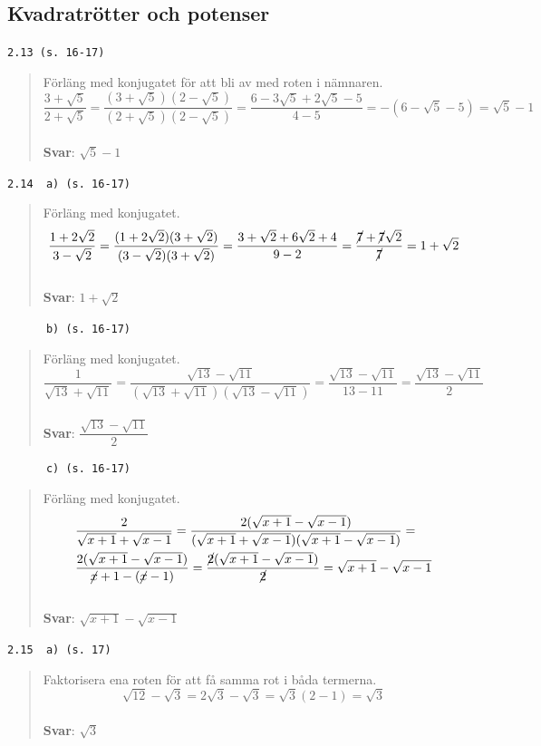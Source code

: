 \documentclass[a4paper]{article}
\newcommand{\tskcol}[1]{\textcolor{tskcol}{#1}}
\begin{document}
	\subsection*{Kvadratrötter och potenser}
	
	\texttt{\tskcol{2.13 (s. 16-17)}}
	\begin{quotation}
		\noindent
		Förläng med konjugatet för att bli av med roten i nämnaren.
		\[\dfrac{3+\sqrt{5}}{2+\sqrt{5}}=
		\dfrac{(3+\sqrt{5})(2-\sqrt{5})}{(2+\sqrt{5})(2-\sqrt{5})}=
		\dfrac{6-3\sqrt{5}+2\sqrt{5}-5}{4-5}=
		-(6-\sqrt{5}-5)=
		\sqrt{5}-1\]
		\\
		\textbf{Svar}: $\sqrt{5}-1$
	\end{quotation}
	
	\texttt{\tskcol{2.14~~a) (s. 16-17)}}
	\begin{quotation}
		\noindent
		Förläng med konjugatet.
		\[\dfrac{1+2\sqrt{2}}{3-\sqrt{2}}=
		\dfrac{(1+2\sqrt{2})(3+\sqrt{2})}{(3-\sqrt{2})(3+\sqrt{2})}=
		\dfrac{3+\sqrt{2}+6\sqrt{2}+4}{9-2}=
		\dfrac{\cancel{7}+\cancel{7}\sqrt{2}}{\cancel{7}}=
		1+\sqrt{2}\]
		\\
		\textbf{Svar}: $1+\sqrt{2}$
		
	\end{quotation}
	
	\pagebreak
	\texttt{\tskcol{~~~~~~b) (s. 16-17)}}
	\begin{quotation}
		\noindent
		Förläng med konjugatet.
		\[\dfrac{1}{\sqrt{13}+\sqrt{11}}=
		\dfrac{\sqrt{13}-\sqrt{11}}{(\sqrt{13}+\sqrt{11})(\sqrt{13}-\sqrt{11})}=
		\dfrac{\sqrt{13}-\sqrt{11}}{13-11}=
		\dfrac{\sqrt{13}-\sqrt{11}}{2}\]
		\\
		\textbf{Svar}: $\dfrac{\sqrt{13}-\sqrt{11}}{2}$
	\end{quotation}
	
	\texttt{\tskcol{~~~~~~c) (s. 16-17)}}
	\begin{quotation}
		\noindent
		Förläng med konjugatet.
		\begin{align*}
		&\dfrac{2}{\sqrt{x+1}+\sqrt{x-1}}=
		\dfrac{2(\sqrt{x+1}-\sqrt{x-1})}{(\sqrt{x+1}+\sqrt{x-1})(\sqrt{x+1}-\sqrt{x-1})}= \\
		&\dfrac{2(\sqrt{x+1}-\sqrt{x-1})}{\cancel{x}+1-(\cancel{x}-1)}=
		\dfrac{\cancel{2}(\sqrt{x+1}-\sqrt{x-1})}{\cancel{2}}=
		\sqrt{x+1}-\sqrt{x-1}
		\end{align*}
		\\
		\textbf{Svar}: $\sqrt{x+1}-\sqrt{x-1}$
	\end{quotation}
	
	\texttt{\tskcol{2.15~~a) (s. 17)}}
	\begin{quotation}
		\noindent
		Faktorisera ena roten för att få samma rot i båda termerna.
		\[\sqrt{12}-\sqrt{3}=
		2\sqrt{3}-\sqrt{3}=
		\sqrt{3}(2-1)=
		\sqrt{3}\]
		\\
		\textbf{Svar}: $\sqrt{3}$
	\end{quotation}
	
\end{document}
